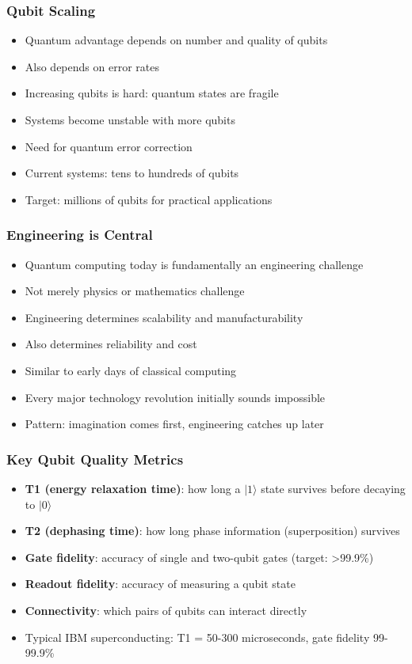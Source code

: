 \begin{frame}[fragile]\frametitle{Qubit Scaling}
\begin{itemize}
\item Quantum advantage depends on number and quality of qubits
\item Also depends on error rates
\item Increasing qubits is hard: quantum states are fragile
\item Systems become unstable with more qubits
\item Need for quantum error correction
\item Current systems: tens to hundreds of qubits
\item Target: millions of qubits for practical applications
\end{itemize}
\end{frame}

\begin{frame}[fragile]\frametitle{Engineering is Central}
\begin{itemize}
\item Quantum computing today is fundamentally an engineering challenge
\item Not merely physics or mathematics challenge
\item Engineering determines scalability and manufacturability
\item Also determines reliability and cost
\item Similar to early days of classical computing
\item Every major technology revolution initially sounds impossible
\item Pattern: imagination comes first, engineering catches up later
\end{itemize}
\end{frame}

\begin{frame}[fragile]\frametitle{Key Qubit Quality Metrics}
\begin{itemize}
\item \textbf{T1 (energy relaxation time)}: how long a $|1\rangle$ state survives before decaying to $|0\rangle$
\item \textbf{T2 (dephasing time)}: how long phase information (superposition) survives
\item \textbf{Gate fidelity}: accuracy of single and two-qubit gates (target: >99.9\%)
\item \textbf{Readout fidelity}: accuracy of measuring a qubit state
\item \textbf{Connectivity}: which pairs of qubits can interact directly
\item Typical IBM superconducting: T1 = 50-300 microseconds, gate fidelity 99-99.9\%
\end{itemize}
\end{frame}

